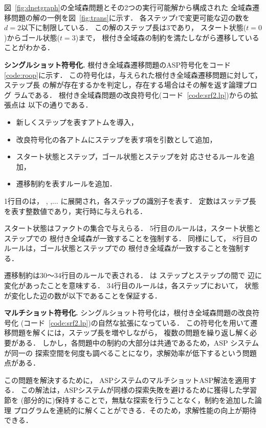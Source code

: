 図~\ref{fig:dnetgraph}の全域森問題とその2つの実行可能解から構成された
全域森遷移問題の解の一例を図~\ref{fig:trans}に示す．
各ステップ$t$で変更可能な辺の数を$d=2$以下に制限している．
この解のステップ長は3であり，
スタート状態($t=0$)からゴール状態($t=3$)まで，
根付き全域森の制約を満たしながら遷移していることがわかる．

\textbf{シングルショット符号化.}
根付き全域森遷移問題のASP符号化をコード\ref{code:roop}に示す．
この符号化は，与えられた根付き全域森遷移問題に対して，ステップ長
の解が存在するかを判定し，存在する場合はその解を返す論理プログ
ラムである．
根付き全域森問題の改良符号化(コード~\ref{code:srf2.lp})からの拡張点は
以下の通りである．
\begin{itemize}
\item 新しくステップを表すアトムを導入，
\item 改良符号化の各アトムにステップを表す項を引数として追加，
\item スタート状態とステップ，ゴール状態とステップを対
  応させるルールを追加，
\item 遷移制約を表すルールを追加．
\end{itemize}
1行目のは，
,
,$\dots$
に展開され，各ステップの識別子を表す．
定数はスッテプ長を表す整数値であり，実行時に与えられる．

スタート状態はファクトの集合で与えらる．
5行目のルールは，スタート状態とステップでの
根付き全域森が一致することを強制する．
同様にして，
8行目のルールは，ゴール状態とステップでの
根付き全域森が一致することを強制する．

遷移制約は30〜34行目のルールで表される．
は
ステップとステップの間で
辺に変化があったことを意味する．
34行目のルールは，各ステップにおいて，
状態が変化した辺の数が以下であることを保証する．

\textbf{マルチショット符号化.}
シングルショット符号化は，根付き全域森問題の改良符号化
(コード~\ref{code:srf2.lp})の自然な拡張になっている．
この符号化を用いて遷移問題を解くには，ステップ長を増やしながら，
複数の問題を繰り返し解く必要がある．
しかし，各問題中の制約の大部分は共通であるため，ASP システムが同一の
探索空間を何度も調べることになり，求解効率が低下するという問題点がある．

この問題を解決するために，
ASPシステム{\clingo}のマルチショットASP解法を適用する．
この解法は，ASPシステムが同様の探索失敗を避けるために獲得した学習節を
(部分的に)保持することで，無駄な探索を行うことなく，制約を追加した論理
プログラムを連続的に解くことができる．そのため，求解性能の向上が期待できる．

